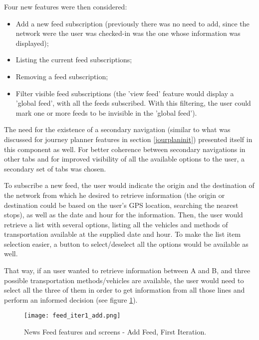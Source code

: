 Four new features were then considered: 

\begin{itemize}
\item Add a new feed subscription (previously there was no need to add, since the network were the user was checked-in was the one whose information was displayed);
\item Listing the current feed subscriptions;
\item Removing a feed subscription;
\item Filter visible feed subscriptions (the 'view feed' feature would display a 'global feed', with all the feeds subscribed. With this filtering, the user could mark one or more feeds to be invisible in the 'global feed').
\end{itemize}

The need for the existence of a secondary navigation (similar to what was discussed for journey planner features in section \ref{jourplaninit}) presented itself in this component as well. For better coherence between secondary navigations in other tabs and for improved visibility of all the available options to the user, a secondary set of tabs was chosen.

To subscribe a new feed, the user would indicate the origin and the destination of the network from which he desired to retrieve information (the origin or destination could be based on the user's GPS location, searching the nearest stops), as well as the date and hour for the information. 
Then, the user would retrieve a list with several options, listing all the vehicles and methods of transportation available at the supplied date and hour. To make the list item selection easier, a button to select/deselect all the options would be available as well.

That way, if an user wanted to retrieve information between A and B, and three possible transportation methods/vehicles are available, the user would need to select all the three of them in order to get information from all those lines and perform an informed decision (see figure \ref{fig:feed_iter1_add}).

\begin{figure}[htb]
  \begin{center}
    \leavevmode
    \texttt{[image: feed\_iter1\_add.png]}
    \caption{News Feed features and screens - Add Feed, First Iteration.}
    \label{fig:feed_iter1_add}
  \end{center}
\end{figure}


